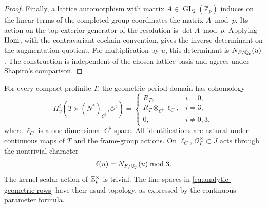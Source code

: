 \begin{proof}
Finally, a lattice automorphism with matrix \(A\in
\operatorname{GL}_2(\mathbb Z_p)\) induces on the linear terms of
the completed group coordinates the matrix \(A\bmod p\).
Its action on the top exterior generator of the resolution is
\(\det A\bmod p\).  Applying \(\operatorname{Hom}\), with the contravariant
cochain convention, gives the inverse determinant on the
augmentation quotient.  For multiplication by \(u\), this
determinant is \(N_{F/\mathbb Q_p}(u)\).  The construction is independent of
the chosen lattice basis and agrees under Shapiro's comparison.
\end{proof}

\begin{proposition}
\label{prop:geometric-cohomology}
For every compact profinite \(T\), the geometric period domain has
cohomology
\begin{equation}
 H^i_v(T\times(N^\ast)_{C^\flat},\mathcal O^\flat)
 =
 \begin{cases}
 R_T,&i=0,\\
 R_T\otimes_{C^\flat}\ell_C,&i=3,\\
 0,&i\neq0,3,
 \end{cases}
 \label{eq:analytic-geometric-rows}
\end{equation}
where \(\ell_C\) is a one-dimensional \(C^\flat\)-space.
All identifications are natural under continuous maps of \(T\)
and the frame-group actions.  On \(\ell_C\),
\(\mathcal O_F^\times\subset J\) acts through the nontrivial
character
\[
 \delta(u)=N_{F/\mathbb Q_p}(u)\bmod3.
\]
The kernel-scalar action of \(\mathbb Z_p^\times\) is trivial.
The line spaces in \eqref{eq:analytic-geometric-rows} have their
usual topology, as expressed by the continuous-parameter formula.
\end{proposition}

